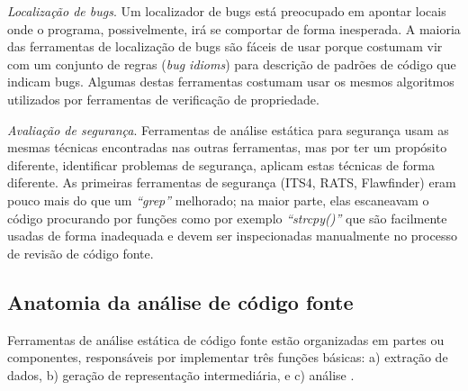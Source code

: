 \begin{description}
  \item \textit{Localização de bugs}. 
    Um localizador de bugs está
    preocupado em apontar locais onde o programa, possivelmente, irá se
    comportar de forma inesperada. A maioria das ferramentas de localização de
    bugs são fáceis de usar porque costumam vir com um conjunto de regras
    ({\it bug idioms}) para descrição de padrões de código que indicam bugs.
    Algumas destas ferramentas costumam usar os mesmos algoritmos utilizados
    por ferramentas de verificação de propriedade.

  \item \textit{Avaliação de segurança}. 
    Ferramentas de análise estática para segurança usam as mesmas técnicas
    encontradas nas outras ferramentas, mas por ter um propósito diferente,
    identificar problemas de segurança, aplicam estas técnicas de forma diferente.
    As primeiras ferramentas de segurança (ITS4, RATS, Flawfinder) eram pouco mais
    do que um {\it ``grep''} melhorado; na maior parte, elas escaneavam o código
    procurando por funções como por exemplo {\it ``strcpy()''} que são
    facilmente usadas de forma inadequada e devem ser inspecionadas
    manualmente no processo de revisão de código fonte.

\end{description}

\subsection{Anatomia da análise de código fonte} \label{anatomia}

Ferramentas de análise estática de código fonte estão organizadas em partes ou
componentes, responsáveis por implementar três funções básicas: a) extração de dados, b) geração de representação
intermediária, e c) análise \cite{Cruz2009, Binkley2007}.


